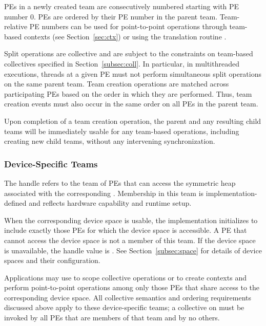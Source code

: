\acp{PE} in a newly created team are consecutively numbered starting with
\ac{PE} number 0. \acp{PE} are ordered by their \ac{PE} number in
the parent team. Team-relative \ac{PE}
numbers can be used for point-to-point operations through team-based
contexts (see Section~\ref{sec:ctx}) or using the translation routine
.

Split operations are collective and are subject to the constraints on
team-based collectives specified in Section~\ref{subsec:coll}. In particular,
in multithreaded executions, threads at a given \ac{PE} must not perform
simultaneous split operations on the same parent team.
Team creation operations are matched across participating \acp{PE} based
on the order in which they are performed. Thus, team creation events must also
occur in the same order on all \acp{PE} in the parent team.

Upon completion of a team creation operation, the parent and any resulting child teams
will be immediately usable for any team-based operations, including creating new child
teams, without any intervening synchronization.

\subsubsection*{Device-Specific Teams}

The handle  refers to the team of \acp{PE}
that can access the symmetric heap associated with the corresponding
. Membership in this team is
implementation-defined and reflects hardware capability and runtime setup.

When the corresponding device space is usable, the implementation initializes
 to include exactly those \acp{PE} for
which the device space is accessible. A \ac{PE} that cannot access the device
space is not a member of this team. If the device space is unavailable, the
handle value is . See
Section~\ref{subsec:space} for details of device spaces and their
configuration.

Applications may use  to scope collective
operations or to create contexts and perform point-to-point operations among
only those \acp{PE} that share access to the corresponding device space. All
collective semantics and ordering requirements discussed above apply to these
device-specific teams; a collective on 
must be invoked by all \acp{PE} that are members of that team and by no
others.
